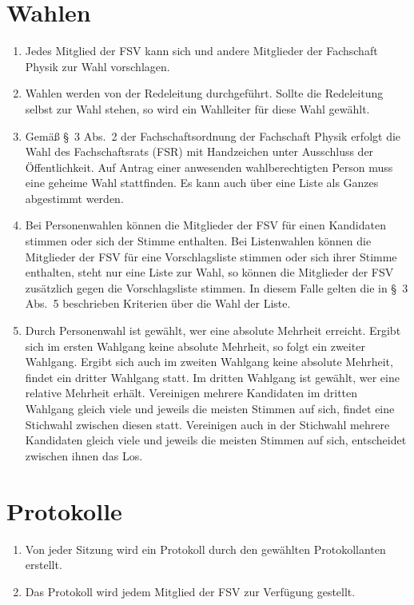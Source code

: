 \documentclass[
	a4paper,
	12pt,
	oneside,
	parskip=half-,
	pagesize,
	headsepline,
	german,
	ngerman
]{scrartcl}
\begin{document}
\section{Wahlen}
\begin{enumerate}
	\item Jedes Mitglied der FSV kann sich und andere Mitglieder der Fachschaft Physik zur Wahl vorschlagen.
	\item Wahlen werden von der Redeleitung durchgeführt. Sollte die Redeleitung selbst zur Wahl stehen, so wird ein Wahlleiter für diese Wahl gewählt.
	\item Gemäß §~3 Abs.~2 der Fachschaftsordnung der Fachschaft Physik erfolgt die Wahl des Fachschaftsrats (FSR) mit Handzeichen unter Ausschluss der Öffentlichkeit. Auf Antrag einer anwesenden wahlberechtigten Person muss eine geheime Wahl stattfinden. Es kann auch über eine Liste als Ganzes abgestimmt werden. 
	\item Bei Personenwahlen können die Mitglieder der FSV für einen Kandidaten stimmen oder sich der Stimme enthalten. Bei Listenwahlen können die Mitglieder der FSV für eine Vorschlagsliste stimmen oder sich ihrer Stimme enthalten, steht nur eine Liste zur Wahl, so können die Mitglieder der FSV zusätzlich gegen die Vorschlagsliste stimmen. In diesem Falle gelten die in §~3 Abs.~5 beschrieben Kriterien über die Wahl der Liste. 
	\item Durch Personenwahl ist gewählt, wer eine absolute Mehrheit erreicht. Ergibt sich im ersten Wahlgang keine absolute Mehrheit, so folgt ein zweiter Wahlgang. Ergibt sich auch im zweiten Wahlgang keine absolute Mehrheit, findet ein dritter Wahlgang statt. Im dritten Wahlgang ist gewählt, wer eine relative Mehrheit erhält. Vereinigen mehrere Kandidaten im dritten Wahlgang gleich viele und jeweils die meisten Stimmen auf sich, findet eine Stichwahl zwischen diesen statt. Vereinigen auch in der Stichwahl mehrere Kandidaten gleich viele und jeweils die meisten Stimmen auf sich, entscheidet zwischen ihnen das Los. 
\end{enumerate}

\section{Protokolle}
\begin{enumerate}
	\item Von jeder Sitzung wird ein Protokoll durch den gewählten Protokollanten erstellt.
	\item Das Protokoll wird jedem Mitglied der FSV  zur Verfügung gestellt. 
\end{enumerate}
\end{document}
